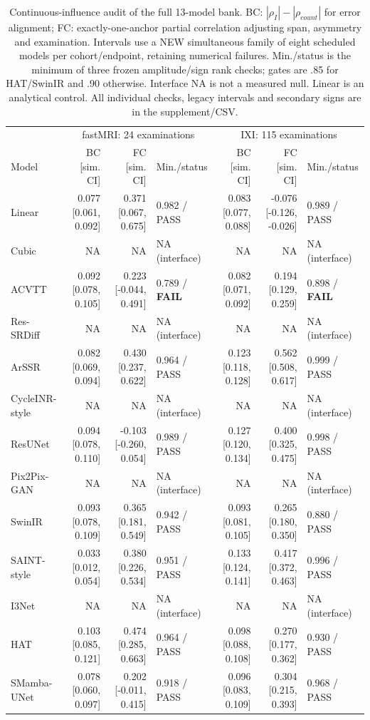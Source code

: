 \begin{table}[t]\centering\footnotesize
\caption{Continuous-influence audit of the full 13-model bank. BC: $|\rho_I|-|\rho_{count}|$ for error alignment; FC: exactly-one-anchor partial correlation adjusting span, asymmetry and examination. Intervals use a NEW simultaneous family of eight scheduled models per cohort/endpoint, retaining numerical failures. Min./status is the minimum of three frozen amplitude/sign rank checks; gates are .85 for HAT/SwinIR and .90 otherwise. Interface NA is not a measured null. Linear is an analytical control. All individual checks, legacy intervals and secondary signs are in the supplement/CSV.}
\label{tab:continuous-big}\setlength{\tabcolsep}{3pt}
\begin{tabular}{lrrlrrl}\toprule
& \multicolumn{3}{c}{fastMRI: 24 examinations} & \multicolumn{3}{c}{IXI: 115 examinations}\\
Model & BC [sim. CI] & FC [sim. CI] & Min./status & BC [sim. CI] & FC [sim. CI] & Min./status\\\midrule
Linear & 0.077 [0.061, 0.092] & 0.371 [0.067, 0.675] & 0.982 / PASS & 0.083 [0.077, 0.088] & -0.076 [-0.126, -0.026] & 0.989 / PASS\\
Cubic & NA & NA & NA (interface) & NA & NA & NA (interface)\\
ACVTT & 0.092 [0.078, 0.105] & 0.223 [-0.044, 0.491] & 0.789 / \textbf{FAIL} & 0.082 [0.071, 0.092] & 0.194 [0.129, 0.259] & 0.898 / \textbf{FAIL}\\
Res-SRDiff & NA & NA & NA (interface) & NA & NA & NA (interface)\\
ArSSR & 0.082 [0.069, 0.094] & 0.430 [0.237, 0.622] & 0.964 / PASS & 0.123 [0.118, 0.128] & 0.562 [0.508, 0.617] & 0.999 / PASS\\
CycleINR-style & NA & NA & NA (interface) & NA & NA & NA (interface)\\
ResUNet & 0.094 [0.078, 0.110] & -0.103 [-0.260, 0.054] & 0.989 / PASS & 0.127 [0.120, 0.134] & 0.400 [0.325, 0.475] & 0.998 / PASS\\
Pix2Pix-GAN & NA & NA & NA (interface) & NA & NA & NA (interface)\\
SwinIR & 0.093 [0.078, 0.109] & 0.365 [0.181, 0.549] & 0.942 / PASS & 0.093 [0.081, 0.105] & 0.265 [0.180, 0.350] & 0.880 / PASS\\
SAINT-style & 0.033 [0.012, 0.054] & 0.380 [0.226, 0.534] & 0.951 / PASS & 0.133 [0.124, 0.141] & 0.417 [0.372, 0.463] & 0.996 / PASS\\
I3Net & NA & NA & NA (interface) & NA & NA & NA (interface)\\
HAT & 0.103 [0.085, 0.121] & 0.474 [0.285, 0.663] & 0.964 / PASS & 0.098 [0.088, 0.108] & 0.270 [0.177, 0.362] & 0.930 / PASS\\
SMamba-UNet & 0.078 [0.060, 0.097] & 0.202 [-0.011, 0.415] & 0.918 / PASS & 0.096 [0.083, 0.109] & 0.304 [0.215, 0.393] & 0.968 / PASS\\\bottomrule\end{tabular}\end{table}